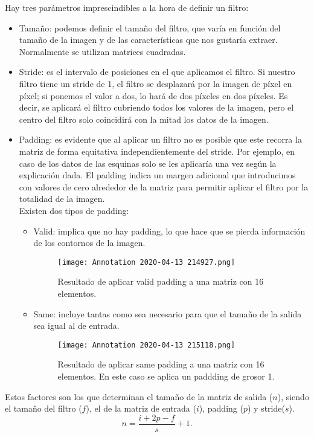 \documentclass[a4paper,11pt]{article}
\begin{document}
\noindent
Hay tres parámetros imprescindibles a la hora de definir un filtro:
\begin{itemize}
\item Tamaño: podemos definir el tamaño del filtro, que varía en función del tamaño de la imagen y de las características que nos gustaría extraer.  Normalmente se utilizan matrices cuadradas.
\item Stride:  es el intervalo de posiciones en el que aplicamos el filtro. Si nuestro filtro tiene un stride de 1, el filtro se desplazará por la imagen de píxel en píxel;  si ponemos el valor a dos, lo hará de dos píxeles en dos píxeles. Es decir, se aplicará el filtro cubriendo todos los valores de la imagen, pero el centro del filtro solo coincidirá con la mitad los datos de la imagen. 
\item Padding: es evidente que al aplicar un filtro no es posible que este recorra la matriz de forma equitativa independientemente del stride. Por ejemplo, en caso de los datos de las esquinas solo se les aplicaría una vez según la explicación dada. El padding indica un margen adicional que introducimos con valores de cero alrededor de la matriz para permitir aplicar el filtro por la totalidad de la imagen. \\

\noindent
Existen dos tipos de padding:
	\begin{itemize}
	\item Valid: implica que no hay padding, lo que hace que se pierda información de los contornos de la imagen.\begin{figure}[H]
\centering
\texttt{[image: Annotation 2020-04-13 214927.png]}
\caption{Resultado de aplicar valid padding a una matriz con 16 elementos.}
\end{figure}
	\item Same: incluye tantas como sea necesario para que el tamaño de la salida sea igual al de entrada.\begin{figure}[H]
\centering
\texttt{[image: Annotation 2020-04-13 215118.png]}
\caption{Resultado de aplicar same padding a una matriz con 16 elementos. En este caso se aplica un paddding de grosor 1.}
\end{figure}
	\end{itemize}
\end{itemize}
Estos factores son los que determinan el tamaño de la matriz de salida ($n$), siendo el tamaño del filtro ($f$), el de la matriz de entrada ($i$), padding ($p$) y stride($s$).
\begin{equation}
n=\frac{i+2p-f}{s}  +1.
\end{equation}
\end{document}
